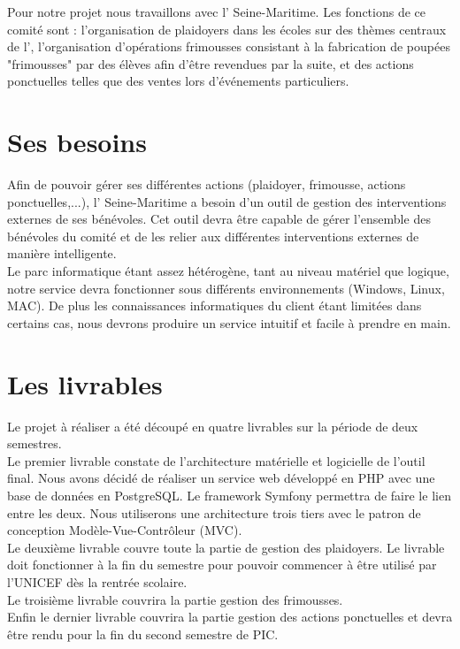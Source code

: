 \documentclass[asi]{picInsa}
\begin{document}
Pour notre projet nous travaillons avec l'\nomClient{} Seine-Maritime. Les fonctions de ce comité sont : l'organisation de plaidoyers dans les écoles sur des thèmes centraux de l'\nomClient, l'organisation d'opérations frimousses consistant à la fabrication de poupées "frimousses" par des élèves afin d'être revendues par la suite, et des actions ponctuelles telles que des ventes lors d’événements particuliers.



\section{Ses besoins}
Afin de pouvoir gérer ses différentes actions (plaidoyer, frimousse, actions ponctuelles,...), l'\nomClient{} Seine-Maritime a besoin d'un outil de gestion des interventions externes de ses bénévoles. Cet outil devra être capable de gérer l'ensemble des bénévoles du comité et de les relier aux différentes interventions externes de manière intelligente.\\
Le parc informatique étant assez hétérogène, tant au niveau matériel que logique, notre service devra fonctionner sous différents environnements (Windows, Linux, MAC). De plus les connaissances informatiques du client étant limitées dans certains cas, nous devrons produire un service intuitif et facile à prendre en main.



\section{Les livrables}
Le projet à réaliser a été découpé en quatre livrables sur la période de deux semestres.\vspace{0.5cm}\\
Le premier livrable constate de l'architecture matérielle et logicielle de l'outil final. Nous avons décidé de réaliser un service web développé en PHP avec une base de données en PostgreSQL. Le framework Symfony permettra de faire le lien entre les deux. Nous utiliserons une architecture trois tiers avec le patron de conception Modèle-Vue-Contrôleur (MVC).\vspace{0.5cm}\\
Le deuxième livrable couvre toute la partie de gestion des plaidoyers. Le livrable doit fonctionner à la fin du semestre pour pouvoir commencer à être utilisé par l'UNICEF dès la rentrée scolaire.\vspace{0.5cm}\\
Le troisième livrable couvrira la partie gestion des frimousses.\vspace{0.5cm}\\
Enfin le dernier livrable couvrira la partie gestion des actions ponctuelles et devra être rendu pour la fin du second semestre de PIC.
\end{document}
